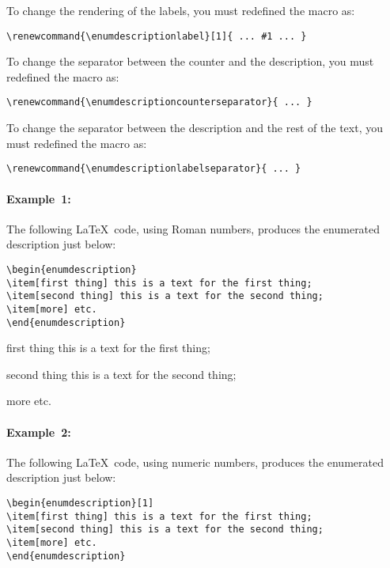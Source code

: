 \documentclass[book]{upmethodology-document}
\begin{document}
To change the rendering of the labels, you must redefined the macro as:
\begin{verbatim}
\renewcommand{\enumdescriptionlabel}[1]{ ... #1 ... }
\end{verbatim}

To change the separator between the counter and the description, you must redefined the macro as:
\begin{verbatim}
\renewcommand{\enumdescriptioncounterseparator}{ ... }
\end{verbatim}

To change the separator between the description and the rest of the text, you must redefined the macro as:
\begin{verbatim}
\renewcommand{\enumdescriptionlabelseparator}{ ... }
\end{verbatim}

\paragraph{Example~1:} The following \LaTeX~code, using Roman numbers, produces the enumerated description just below:
\begin{verbatim}
\begin{enumdescription}
\item[first thing] this is a text for the first thing;
\item[second thing] this is a text for the second thing;
\item[more] etc.
\end{enumdescription}
\end{verbatim}

\begin{enumdescription}
\item[first thing] this is a text for the first thing;
\item[second thing] this is a text for the second thing;
\item[more] etc.
\end{enumdescription}

\paragraph{Example~2:} The following \LaTeX~code, using numeric numbers, produces the enumerated description just below:
\begin{verbatim}
\begin{enumdescription}[1]
\item[first thing] this is a text for the first thing;
\item[second thing] this is a text for the second thing;
\item[more] etc.
\end{enumdescription}
\end{verbatim}
\end{document}
